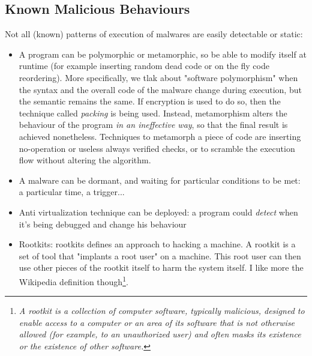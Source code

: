 \documentclass{article}
\begin{document}
			\subsection{Known Malicious Behaviours}
				Not all (known) patterns of execution of malwares are easily detectable or static:
				\begin{itemize}
					\item A program can be polymorphic or metamorphic, so be able to modify itself at runtime (for example inserting random dead code or on the fly code reordering). More specifically, we tlak about "software polymorphism" when the syntax and the overall code of the malware change during execution, but the semantic remains the same. If encryption is used to do so, then the technique called \emph{packing} is being used. Instead, metamorphism alters the behaviour of the program \emph{in an ineffective way}, so that the final result is achieved nonetheless. Techniques to metamorph a piece of code are inserting no-operation or useless always verified checks, or to scramble the execution flow without altering the algorithm. 
					\item A malware can be dormant, and waiting for particular conditions to be met: a particular time, a trigger...
					\item Anti virtualization technique can be deployed: a program could \emph{detect} when it's being debugged and change his behaviour
					\item Rootkits: rootkits defines an approach to hacking a machine. A rootkit is a set of tool that "implants a root user" on a machine. This root user can then use other pieces of the rootkit itself to harm the system itself. I like more the Wikipedia definition though\footnote{\emph{A rootkit is a collection of computer software, typically malicious, designed to enable access to a computer or an area of its software that is not otherwise allowed (for example, to an unauthorized user) and often masks its existence or the existence of other software.}}.
				\end{itemize}
				
\end{document}

